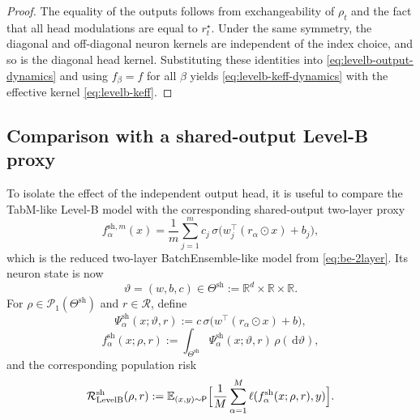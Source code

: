\documentclass[11pt]{article}
\theoremstyle{definition}
\newcommand{\R}{\mathbb{R}}
\newcommand{\E}{\mathbb{E}}
\newcommand{\PP}{\mathcal{P}}
\newcommand{\dd}{\,\mathrm{d}}
\begin{document}
\begin{proof}
The equality of the outputs follows from exchangeability of $\rho_t$ and the fact that all head modulations are equal to $r_t^\star$.
Under the same symmetry, the diagonal and off-diagonal neuron kernels are independent of the index choice, and so is the diagonal head kernel.
Substituting these identities into \eqref{eq:levelb-output-dynamics} and using $f_\beta=f$ for all $\beta$ yields \eqref{eq:levelb-keff-dynamics} with the effective kernel \eqref{eq:levelb-keff}.
\end{proof}

\subsection{Comparison with a shared-output Level-B proxy}

To isolate the effect of the independent output head, it is useful to compare the TabM-like Level-B model with the corresponding shared-output two-layer proxy
\begin{equation}
  f_{\alpha}^{\mathrm{sh},m}(x)
  =
  \frac1m\sum_{j=1}^m
  c_j\,\sigma\bigl(w_j^\top (r_\alpha\odot x)+b_j\bigr),
  \label{eq:levelb-shared-finite}
\end{equation}
which is the reduced two-layer BatchEnsemble-like model from \eqref{eq:be-2layer}.
Its neuron state is now
\[
  \vartheta=(w,b,c)\in \Theta^{\mathrm{sh}}:=\R^d\times \R\times \R.
\]
For $\rho\in \PP_1(\Theta^{\mathrm{sh}})$ and $r\in \mathcal R$, define
\[
  \Psi_\alpha^{\mathrm{sh}}(x;\vartheta,r)
  :=
  c\,\sigma\bigl(w^\top(r_\alpha\odot x)+b\bigr),
\]
\[
  f_\alpha^{\mathrm{sh}}(x;\rho,r)
  :=
  \int_{\Theta^{\mathrm{sh}}}
  \Psi_\alpha^{\mathrm{sh}}(x;\vartheta,r)\,\rho(\dd \vartheta),
\]
and the corresponding population risk
\[
  \mathcal R_{\mathrm{LevelB}}^{\mathrm{sh}}(\rho,r)
  :=
  \E_{(x,y)\sim\mathsf P}
  \Bigl[
    \frac1M\sum_{\alpha=1}^M
    \ell(f_\alpha^{\mathrm{sh}}(x;\rho,r),y)
  \Bigr].
\]
\end{document}
